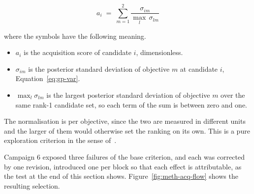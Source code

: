 \begin{equation}
a_i \;=\; \sum_{m=1}^{2} \frac{\sigma_{im}}{\max_{l}\,\sigma_{lm}}
\label{eq:acq-score}
\end{equation}

\noindent where the symbols have the following meaning.

\begin{itemize}
  \item $a_i$ is the acquisition score of candidate $i$, dimensionless.
  \item $\sigma_{im}$ is the posterior standard deviation of objective
        $m$ at candidate $i$, Equation~\eqref{eq:gp-var}.
  \item $\max_l \sigma_{lm}$ is the largest posterior standard deviation
        of objective $m$ over the same rank-1 candidate set, so each term
        of the sum is between zero and one.
\end{itemize}

The normalisation is per objective, since the two are measured
in different units and the larger of them would otherwise set the
ranking on its own. This is a pure exploration criterion in the sense
of~\cite{forrester_book_2008}.

Campaign 6 exposed three failures of the base criterion, and each was
corrected by one revision, introduced one per block so that each effect
is attributable, as the test at the end of this section shows.
Figure~\ref{fig:meth-acq-flow} shows the resulting selection.

